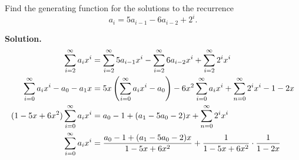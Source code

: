 \documentclass{book}
\begin{document}
\setcounter{project}{262}
\addtocounter{project}{-1}
\begin{activity}[]\label{secondordernonhomo}
\hypertarget{p-1378}{}%
Find the generating function for the solutions to the recurrence%
\begin{equation*}
a_i=5a_{i-1}-6a_{i-2} + 2^i.
\end{equation*}
%
\par\smallskip%
\noindent\textbf{Solution.}\hypertarget{solution-174}{}\quad%
\hypertarget{p-1379}{}%
%
\begin{align*}
\sum_{i=2}^\infty a_ix^i  &=  \sum_{i=2}^\infty
5a_{i-1}x^i-\sum_{i=2}^\infty 6a_{i-2}x^i + \sum_{i=2}^\infty 2^ix^i\\
\sum_{i=0}^\infty a_ix^i -a_0-a_1x  &=
5x\left(\sum_{i=0}^\infty
a_{i}x^i-a_0\right)-6x^2\sum_{i=0}^\infty a_{i}x^i + \sum_{n=0}^\infty
2^ix^i-1-2x\\
(1-5x+6x^2)\sum_{i=0}^\infty a_ix^i &= a_0-1+(a_1-5a_0-2)x +
\sum_{n=0}^\infty 2^ix^i\\
\sum_{i=0}^\infty a_ix^i &=  \frac{a_0-1+(a_1-5a_0-2)x}{1-5x+6x^2}+ \frac{1}{1-5x+6x^2}\cdot\frac{1}{1-2x}
\end{align*}
%
\end{activity}
\end{document}
